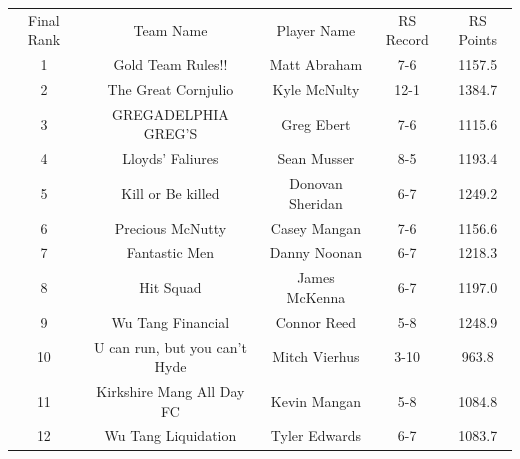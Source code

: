\documentclass[11pt,letterpaper]{article}
\begin{document}
\vspace{-25pt}
\begin{table} [h]
\begin{center}
\begin{tabular} { c c c c c }
\\ Final Rank & Team Name & Player Name & RS Record & RS Points
\\ 1 & Gold Team Rules!! & Matt Abraham & 7-6 & 1157.5
\\ 2 & The Great Cornjulio & Kyle McNulty & 12-1 & 1384.7
\\ 3 & GREGADELPHIA GREG'S & Greg Ebert & 7-6 & 1115.6
\\ 4 & Lloyds' Faliures & Sean Musser & 8-5 & 1193.4
\\ 5 & Kill or Be killed & Donovan Sheridan & 6-7 & 1249.2
\\ 6 & Precious McNutty & Casey Mangan & 7-6 & 1156.6
\\ 7 & Fantastic Men & Danny Noonan & 6-7 & 1218.3
\\ 8 & Hit Squad & James McKenna & 6-7 & 1197.0
\\ 9 & Wu Tang Financial & Connor Reed & 5-8 & 1248.9
\\ 10 & U can run, but you can't Hyde & Mitch Vierhus & 3-10 & 963.8
\\ 11 & Kirkshire Mang All Day FC & Kevin Mangan & 5-8 & 1084.8
\\ 12 & Wu Tang Liquidation & Tyler Edwards & 6-7 & 1083.7
\end{tabular}
\end{center}
\end{table}
\end{document}
